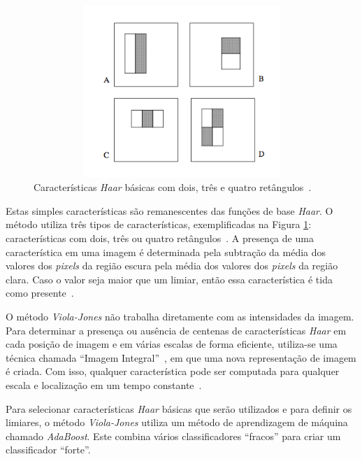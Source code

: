 	\begin{figure}[H]
		\begin{center}
			\includegraphics[height=6.5cm,width=12.5cm]{figuras/2.FundamentacaoTeorica/haarfeaturestypes.png}
		\end{center}
		\caption{Características \textit{Haar} básicas com dois, três e quatro retângulos~\cite{violajones}.}
		\label{haarfeaturestypes}
	\end{figure}

	Estas simples características são remanescentes das funções de base
	\textit{Haar}. O método utiliza três tipos de características, exemplificadas na
	Figura \ref{haarfeaturestypes}: características com dois, três ou quatro
	retângulos~\cite{violajones}. A presença de uma característica em uma imagem é
	determinada pela subtração da média dos valores dos \textit{pixels} da região
	escura pela média dos valores dos \textit{pixels} da região clara. Caso o valor
	seja maior que um limiar, então essa característica é tida como
	presente~\cite{servodetection}.

	O método \textit{Viola-Jones} não trabalha diretamente com as intensidades da
	imagem. Para determinar a presença ou ausência de centenas de características
	\textit{Haar} em cada posição de imagem e em várias escalas de forma eficiente,
	utiliza-se uma técnica chamada ``Imagem Integral''~\cite{servodetection,
	violajones}, em que uma nova representação de imagem é criada. Com isso,
	qualquer característica pode ser computada para qualquer escala e localização em
	um tempo constante~\cite{violajones}.

	Para selecionar características \textit{Haar} básicas que serão utilizados e
	para definir os limiares, o método \textit{Viola-Jones} utiliza um método de
	aprendizagem de máquina chamado \textit{AdaBoost}. Este combina vários
	classificadores ``fracos'' para criar um classificador ``forte''.
	
